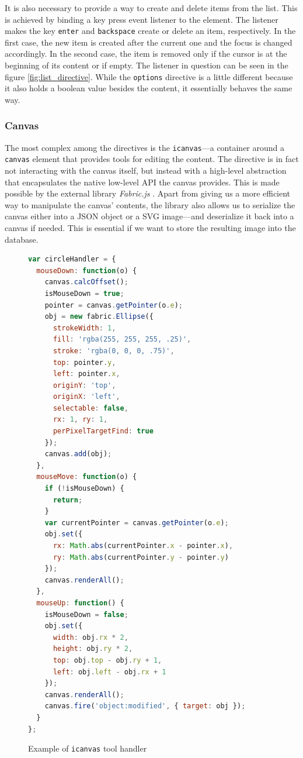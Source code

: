 \documentclass[thesis=M,english,hidelinks]{FITthesis}[2012/10/20]
\newcommand{\code}{\texttt}
\begin{document}
It is also necessary to provide a way to create and delete items from the list. This is achieved by binding a key press event listener to the element. The listener makes the key \code{enter} and \code{backspace} create or delete an item, respectively. In the first case, the new item is created after the current one and the focus is changed accordingly. In the second case, the item is removed only if the cursor is at the beginning of its content or if empty. The listener in question can be seen in the figure \ref{fig:list_directive}. While the \code{options} directive is a little different because it also holds a boolean value besides the content, it essentially behaves the same way.

      \subsubsection{Canvas}

The most complex among the directives is the \code{icanvas}---a container around a \code{canvas} element that provides tools for editing the content. The directive is in fact not interacting with the canvas itself, but instead with a high-level abstraction that encapsulates the native low-level API the canvas provides. This is made possible by the external library \textit{Fabric.js} \cite{fabricjs}. Apart from giving us a more efficient way to manipulate the canvas' contents, the library also allows us to serialize the canvas either into a JSON object or a SVG image---and deserialize it back into a canvas if needed. This is essential if we want to store the resulting image into the database.

\begin{figure}
  \begin{lstlisting}[language=JavaScript]
var circleHandler = {
  mouseDown: function(o) {
    canvas.calcOffset();
    isMouseDown = true;
    pointer = canvas.getPointer(o.e);
    obj = new fabric.Ellipse({
      strokeWidth: 1,
      fill: 'rgba(255, 255, 255, .25)',
      stroke: 'rgba(0, 0, 0, .75)',
      top: pointer.y,
      left: pointer.x,
      originY: 'top',
      originX: 'left',
      selectable: false,
      rx: 1, ry: 1,
      perPixelTargetFind: true
    });
    canvas.add(obj);
  },
  mouseMove: function(o) {
    if (!isMouseDown) {
      return;
    }
    var currentPointer = canvas.getPointer(o.e);
    obj.set({
      rx: Math.abs(currentPointer.x - pointer.x),
      ry: Math.abs(currentPointer.y - pointer.y)
    });
    canvas.renderAll();
  },
  mouseUp: function() {
    isMouseDown = false;
    obj.set({
      width: obj.rx * 2,
      height: obj.ry * 2,
      top: obj.top - obj.ry + 1,
      left: obj.left - obj.rx + 1
    });
    canvas.renderAll();
    canvas.fire('object:modified', { target: obj });
  }
};
  \end{lstlisting}
  \caption{Example of \code{icanvas} tool handler}
  \label{fig:tool_handler}
\end{figure}
\end{document}
